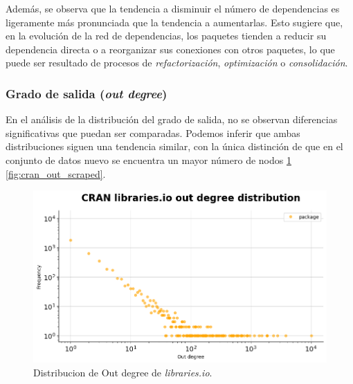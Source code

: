 Además, se observa que la tendencia a disminuir el número de dependencias es ligeramente
más pronunciada que la tendencia a aumentarlas. Esto sugiere que, en la evolución de
la red de dependencias, los paquetes tienden a reducir su dependencia directa o a
reorganizar sus conexiones con otros paquetes, lo que puede ser resultado de procesos
de \textit{refactorización}, \textit{optimización} o \textit{consolidación}.


\subsubsection{Grado de salida (\textit{out degree})}


En el análisis de la distribución del grado de salida, no se observan diferencias significativas
que puedan ser comparadas. Podemos inferir que ambas distribuciones siguen una tendencia
similar, con la única distinción de que en el conjunto de datos nuevo se encuentra un mayor
número de nodos \ref{fig:cran_out_lib} \ref{fig:cran_out_scraped}.

\begin{figure}[h!]
    \begin{center}
        \includegraphics[width=1\textwidth]{img/cran/out_deg.png}
        \caption{Distribucion de Out degree de \textit{libraries.io}.}
        \label{fig:cran_out_lib}
    \end{center}
\end{figure}

